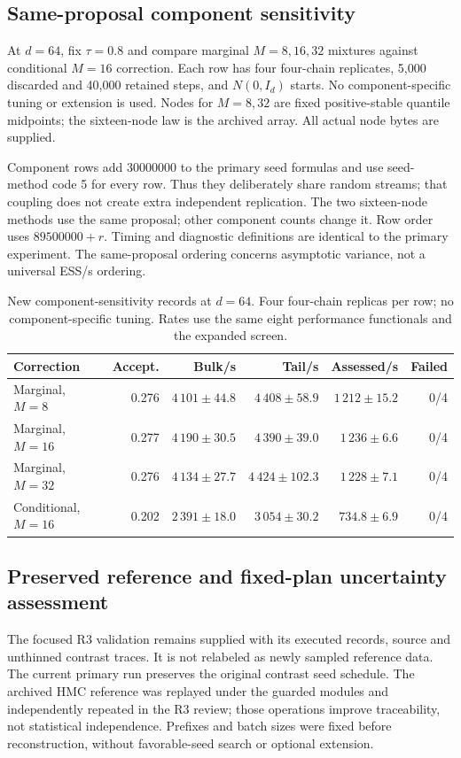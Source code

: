 \documentclass[11pt]{article}
\theoremstyle{definition}\newtheorem{definition}[theorem]{Definition}
\theoremstyle{remark}\newtheorem{remark}[theorem]{Remark}
\numberwithin{equation}{section}
\newcommand{\1}{\mathbf 1}
\begin{document}
\subsection{Same-proposal component sensitivity}
At $d=64$, fix $\tau=0.8$ and compare marginal $M=8,16,32$ mixtures against conditional $M=16$ correction. Each row has four four-chain replicates, 5,000 discarded and 40,000 retained steps, and $N(0,I_d)$ starts. No component-specific tuning or extension is used. Nodes for $M=8,32$ are fixed positive-stable quantile midpoints; the sixteen-node law is the archived array. All actual node bytes are supplied.

Component rows add $30000000$ to the primary seed formulas and use seed-method code 5 for every row. Thus they deliberately share random streams; that coupling does not create extra independent replication. The two sixteen-node methods use the same proposal; other component counts change it. Row order uses $89500000+r$. Timing and diagnostic definitions are identical to the primary experiment. The same-proposal ordering concerns asymptotic variance, not a universal ESS/s ordering.
\begin{table}[tb]\centering\footnotesize\setlength{\tabcolsep}{4pt}
\caption{New component-sensitivity records at $d=64$. Four four-chain replicas per row; no component-specific tuning. Rates use the same eight performance functionals and the expanded screen.}\label{tab:components}
\begin{tabular}{lrrrrr}\toprule Correction&Accept.&Bulk/s&Tail/s&Assessed/s&Failed\\\midrule
Marginal, $M=8$&0.276&$4\,101\pm 44.8$&$4\,408\pm 58.9$&$1\,212\pm 15.2$&0/4\\
Marginal, $M=16$&0.277&$4\,190\pm 30.5$&$4\,390\pm 39.0$&$1\,236\pm 6.6$&0/4\\
Marginal, $M=32$&0.276&$4\,134\pm 27.7$&$4\,424\pm 102.3$&$1\,228\pm 7.1$&0/4\\
Conditional, $M=16$&0.202&$2\,391\pm 18.0$&$3\,054\pm 30.2$&$734.8\pm 6.9$&0/4\\
\bottomrule\end{tabular}\end{table}
\subsection{Preserved reference and fixed-plan uncertainty assessment}\label{sec:r3uncertainty}
The focused R3 validation remains supplied with its executed records, source and unthinned contrast traces. It is not relabeled as newly sampled reference data. The current primary run preserves the original contrast seed schedule. The archived HMC reference was replayed under the guarded modules and independently repeated in the R3 review; those operations improve traceability, not statistical independence. Prefixes and batch sizes were fixed before reconstruction, without favorable-seed search or optional extension.
\end{document}
